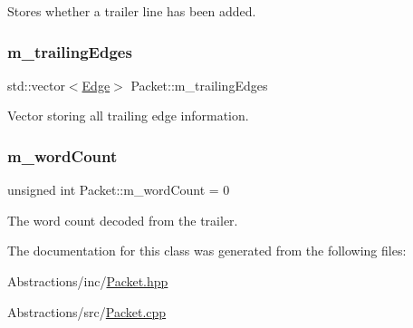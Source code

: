 Stores whether a trailer line has been added. 

\mbox{\label{class_packet_a0a91b78992e75fd203a187dcb34a81c1}} 
\subsubsection{\texorpdfstring{m\+\_\+trailing\+Edges}{m\_trailingEdges}}
{\footnotesize\ttfamily std\+::vector$<$\hyperlink{class_edge}{Edge}$>$ Packet\+::m\+\_\+trailing\+Edges\hspace{0.3cm}{\ttfamily [private]}}



Vector storing all trailing edge information. 

\mbox{\label{class_packet_a6c3f1d98101c049bc032aca63d244b89}} 
\subsubsection{\texorpdfstring{m\+\_\+word\+Count}{m\_wordCount}}
{\footnotesize\ttfamily unsigned int Packet\+::m\+\_\+word\+Count = 0\hspace{0.3cm}{\ttfamily [private]}}



The word count decoded from the trailer. 



The documentation for this class was generated from the following files\+:\begin{DoxyCompactItemize}
\item 
Abstractions/inc/\hyperlink{_packet_8hpp}{Packet.\+hpp}\item 
Abstractions/src/\hyperlink{_packet_8cpp}{Packet.\+cpp}\end{DoxyCompactItemize}
